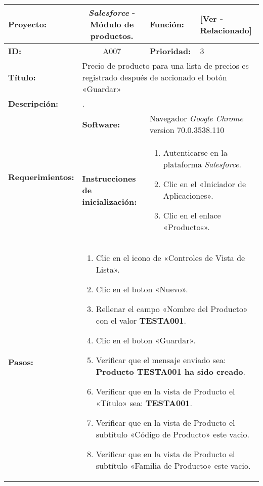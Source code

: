 \begin{table}[H]
\centering
\begin{tabular}{|p{2.5cm}|p{2.5cm}|p{2.8cm}|p{2.5cm}|p{2.6cm}|}
\hline
\footnotesize{\textbf{Proyecto:}} &
\multicolumn{2}{c|}{\footnotesize{\emph{Salesforce} - Módulo de productos.}} &
\footnotesize{\textbf{Función:}} & \footnotesize{[Ver - Relacionado]} \\
\hline
\footnotesize{\textbf{ID:}} & \multicolumn{2}{c|}{\footnotesize{A007}} &
\footnotesize{\textbf{Prioridad:}} & \footnotesize{3} \\
\hline
\footnotesize{\textbf{Título:}} &
\multicolumn{4}{p{12.4cm}|}{\footnotesize{Precio de producto para una lista de
precios es registrado después de accionado el botón «Guardar»}} \\
\hline
\footnotesize{\textbf{Descripción:}} &
\multicolumn{4}{p{12.4cm}|}{\footnotesize{.}} \\
\hline
\multirow{2}{*}{\footnotesize{\textbf{Requerimientos:}}} &
\footnotesize{\textbf{Software:}} &
\multicolumn{3}{p{7.8cm}|}{\footnotesize{Navegador \emph{Google Chrome}
version 70.0.3538.110}} \\
\cline{2-5}
& \footnotesize{\textbf{Instrucciones de inicialización:}} &
\multicolumn{3}{p{7.8cm}|}{\footnotesize{
\begin{enumerate}
\item Autenticarse en la plataforma \emph{Salesforce}.
\item Clic en el «Iniciador de Aplicaciones».
\item Clic en el enlace «Productos».
\end{enumerate}
}} \\
\hline
\footnotesize{\textbf{Pasos:}} &
\multicolumn{4}{p{11.8cm}|}{\footnotesize{
\begin{enumerate}
\item Clic en el icono de «Controles de Vista de Lista».
\item Clic en el boton «Nuevo».
\item Rellenar el campo «Nombre del Producto» con el valor \textbf{TESTA001}.
\item Clic en el boton «Guardar».
\item Verificar que el mensaje enviado sea: \textbf{Producto TESTA001 ha sido creado}.
\item Verificar que en la vista de Producto el «Título» sea: \textbf{TESTA001}.
\item Verificar que en la vista de Producto el subtítulo «Código de Producto» este vacio.
\item Verificar que en la vista de Producto el subtítulo «Familia de Producto» este vacio.

\end{enumerate}}}
\end{tabular}
\end{table}
